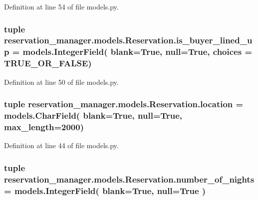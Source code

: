 Definition at line 54 of file models.\-py.

\hypertarget{classreservation__manager_1_1models_1_1Reservation_ad11d83584bd6a7c6b13c9a9ec14945e6}{
\subsubsection[{is\-\_\-buyer\-\_\-lined\-\_\-up}]{\setlength{\rightskip}{0pt plus 5cm}tuple reservation\-\_\-manager.\-models.\-Reservation.\-is\-\_\-buyer\-\_\-lined\-\_\-up = models.\-Integer\-Field( blank=True, null=True, choices = {\bf T\-R\-U\-E\-\_\-\-O\-R\-\_\-\-F\-A\-L\-S\-E})\hspace{0.3cm}{\ttfamily [static]}}}\label{classreservation__manager_1_1models_1_1Reservation_ad11d83584bd6a7c6b13c9a9ec14945e6}


Definition at line 50 of file models.\-py.

\hypertarget{classreservation__manager_1_1models_1_1Reservation_a6a4c731b0619aaddc2c712a28388257a}{
\subsubsection[{location}]{\setlength{\rightskip}{0pt plus 5cm}tuple reservation\-\_\-manager.\-models.\-Reservation.\-location = models.\-Char\-Field( blank=True, null=True, max\-\_\-length=2000)\hspace{0.3cm}{\ttfamily [static]}}}\label{classreservation__manager_1_1models_1_1Reservation_a6a4c731b0619aaddc2c712a28388257a}


Definition at line 44 of file models.\-py.

\hypertarget{classreservation__manager_1_1models_1_1Reservation_a3545295be618596339a711e39cd97db4}{
\subsubsection[{number\-\_\-of\-\_\-nights}]{\setlength{\rightskip}{0pt plus 5cm}tuple reservation\-\_\-manager.\-models.\-Reservation.\-number\-\_\-of\-\_\-nights = models.\-Integer\-Field( blank=True, null=True )\hspace{0.3cm}{\ttfamily [static]}}}\label{classreservation__manager_1_1models_1_1Reservation_a3545295be618596339a711e39cd97db4}


